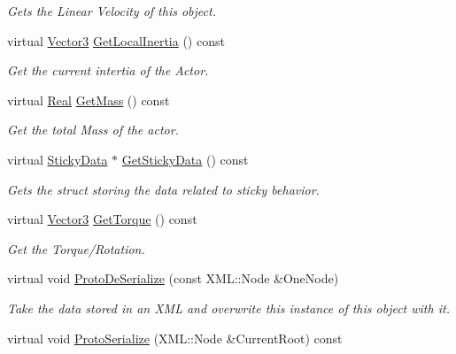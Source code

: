 \begin{DoxyCompactItemize}
\begin{DoxyCompactList}\small\item\em Gets the Linear Velocity of this object. \end{DoxyCompactList}\item 
virtual \hyperlink{classMezzanine_1_1Vector3}{Vector3} \hyperlink{classMezzanine_1_1ActorRigidPhysicsSettings_a71fae7a868e31ce14612336292bc0fca}{Get\-Local\-Inertia} () const 
\begin{DoxyCompactList}\small\item\em Get the current intertia of the Actor. \end{DoxyCompactList}\item 
virtual \hyperlink{namespaceMezzanine_a726731b1a7df72bf3583e4a97282c6f6}{Real} \hyperlink{classMezzanine_1_1ActorRigidPhysicsSettings_a6426940001f8d8e112763f6619278874}{Get\-Mass} () const 
\begin{DoxyCompactList}\small\item\em Get the total Mass of the actor. \end{DoxyCompactList}\item 
virtual \hyperlink{structMezzanine_1_1StickyData}{Sticky\-Data} $\ast$ \hyperlink{classMezzanine_1_1ActorRigidPhysicsSettings_af3b11efb413c1e6a80e4fd5cd3f44715}{Get\-Sticky\-Data} () const 
\begin{DoxyCompactList}\small\item\em Gets the struct storing the data related to sticky behavior. \end{DoxyCompactList}\item 
virtual \hyperlink{classMezzanine_1_1Vector3}{Vector3} \hyperlink{classMezzanine_1_1ActorRigidPhysicsSettings_ae7406aca16a67e3ef959ff9cb76a0f44}{Get\-Torque} () const 
\begin{DoxyCompactList}\small\item\em Get the Torque/\-Rotation. \end{DoxyCompactList}\item 
virtual void \hyperlink{classMezzanine_1_1ActorRigidPhysicsSettings_a94dc33b8a4e969908a6ff97106b98d58}{Proto\-De\-Serialize} (const X\-M\-L\-::\-Node \&One\-Node)
\begin{DoxyCompactList}\small\item\em Take the data stored in an X\-M\-L and overwrite this instance of this object with it. \end{DoxyCompactList}\item 
virtual void \hyperlink{classMezzanine_1_1ActorRigidPhysicsSettings_a6a92bc5cc93a371cf9378aa2d68c2615}{Proto\-Serialize} (X\-M\-L\-::\-Node \&Current\-Root) const 

\end{DoxyCompactItemize}
